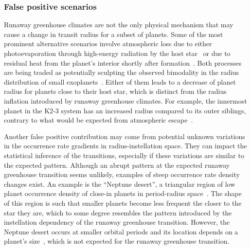 \documentclass[twocolumn,twocolappendix]{aastex631}
\begin{document}
\subsubsection{False positive scenarios}\label{sec:dis_falsepositive}
Runaway greenhouse climates are not the only physical mechanism that may cause a change in transit radius for a subset of planets.
Some of the most prominent alternative scenarios involve atmospheric loss due to either photoevaporation through high-energy radiation by the host star~\citep[e.g.,][]{2012ApJ...753...66I,Owen2013,Jin2014,Mordasini2020a} or due to residual heat from the planet's interior shortly after formation~\citep{Ginzburg2016b,Ginzburg2018,Gupta2019}.
Both processes are being traded as potentially sculpting the observed bimodality in the radius distribution of small exoplanets~\citep{Fulton2017,VanEylen2018}.
Either of them leads to a decrease of planet radius for planets close to their host star, which is distinct from the radius inflation introduced by runaway greenhouse climates.
For example, the innermost planet in the \mbox{K2-3} system has an increased radius compared to its outer siblings, contrary to what would be expected from atmospheric escape~\citep{2022AJ....164..172D}.

Another false positive contribution may come from potential unknown variations in the occurrence rate gradients in radius-instellation space.
They can impact the statistical inference of the transitions, especially if these variations are similar to the expected pattern.
Although an abrupt pattern at the expected runaway greenhouse transition seems unlikely, examples of steep occurrence rate density changes exist.
An example is the ``Neptune desert'', a triangular region of low planet occurrence density of close-in planets in period-radius space~\citep{Szabo2011,Mazeh2016,Dreizler2020b}.
The shape of this region is such that smaller planets become less frequent the closer to the star they are, which to some degree resembles the pattern introduced by the instellation dependency of the runaway greenhouse transition.
However, the Neptune desert occurs at smaller orbital periods and its location depends on a planet's size~\citep{Szabo2011}, which is not expected for the runaway greenhouse transition.
\end{document}
